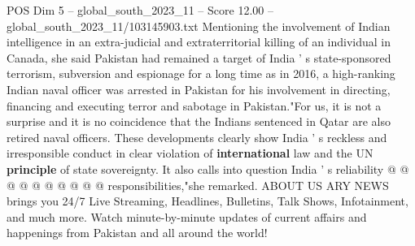 \begin{textsample}{POS Dim 5 – global\_south\_2023\_11 – Score 12.00 – global\_south\_2023\_11/103145903.txt}
Mentioning the involvement of Indian intelligence in an extra-judicial and extraterritorial killing of an individual in Canada, she said Pakistan had remained a target of India ' s state-sponsored terrorism, subversion and espionage for a long time as in 2016, a high-ranking Indian naval officer was arrested in Pakistan for his involvement in directing, financing and executing terror and sabotage in Pakistan."For us, it is not a surprise and it is no coincidence that the Indians sentenced in Qatar are also retired naval officers.
These developments clearly show India ' s reckless and irresponsible conduct in clear violation of \textbf{international} law and the UN \textbf{principle} of state sovereignty.
It also calls into question India ' s reliability @ @ @ @ @ @ @ @ @ @ responsibilities,"she remarked.
ABOUT US ARY NEWS brings you 24/7 Live Streaming, Headlines, Bulletins, Talk Shows, Infotainment, and much more.
Watch minute-by-minute updates of current affairs and happenings from Pakistan and all around the world!

\end{textsample}
